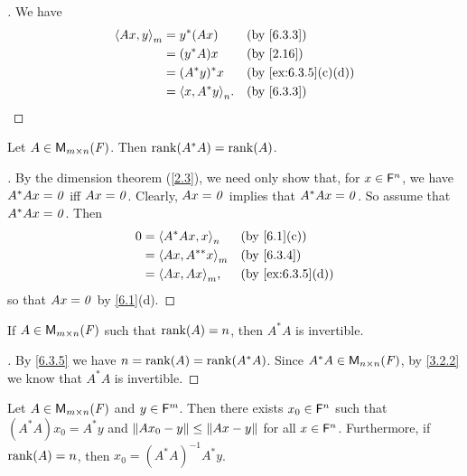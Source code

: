 \begin{proof}[]
  We have
  \begin{align*}
    \inn{Ax, y}_m & = y^* (Ax)          &  & \by{6.3.3}         \\
                  & = (y^* A) x         &  & \by{2.16}          \\
                  & = (A^* y)^* x       &  & \by{ex:6.3.5}[c,d] \\
                  & = \inn{x, A^* y}_n. &  & \by{6.3.3}
  \end{align*}
\end{proof}

\begin{lem}\label{6.3.5}
  Let \(A \in \ms\).
  Then \(\rk{A^* A} = \rk{A}\).
\end{lem}

\begin{proof}[]
  By the dimension theorem (\cref{2.3}), we need only show that, for \(x \in \mathsf{F}^n\), we have \(A^* Ax = \mathit{0}\) iff \(Ax = \mathit{0}\).
  Clearly, \(Ax = \mathit{0}\) implies that \(A^* Ax = \mathit{0}\).
  So assume that \(A^* Ax = \mathit{0}\).
  Then
  \begin{align*}
    0 & = \inn{A^* Ax, x}_n    &  & \by{6.1}[c]      \\
      & = \inn{Ax, A^{**} x}_m &  & \by{6.3.4}       \\
      & = \inn{Ax, Ax}_m,      &  & \by{ex:6.3.5}[d]
  \end{align*}
  so that \(Ax = \mathit{0}\) by \cref{6.1}(d).
\end{proof}

\begin{cor}\label{6.3.6}
  If \(A \in \ms\) such that \(\rk{A} = n\), then \(A^* A\) is invertible.
\end{cor}

\begin{proof}[]
  By \cref{6.3.5} we have \(n = \rk{A} = \rk{A^* A}\).
  Since \(A^* A \in \ms[n][n][\F]\), by \cref{3.2.2} we know that \(A^* A\) is invertible.
\end{proof}

\begin{thm}\label{6.12}
  Let \(A \in \ms\) and \(y \in \mathsf{F}^m\).
  Then there exists \(x_0 \in \mathsf{F}^n\) such that \((A^* A) x_0 = A^* y\) and \(\left\lVert A x_0 - y\right\rVert \leq \left\lVert Ax - y\right\rVert\) for all \(x \in \mathsf{F}^n\).
  Furthermore, if \(\rk{A} = n\), then \(x_0 = (A^* A)^{-1} A^* y\).
\end{thm}

